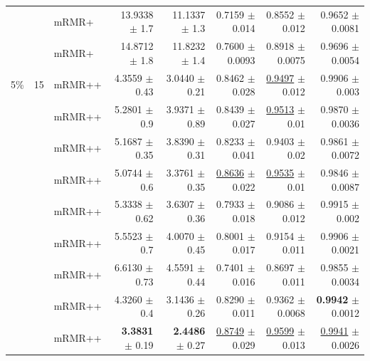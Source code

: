 \begin{longtable}{llp{}rrrrr}
 &  & mRMR+ & 13.9338 {\scriptsize $\pm$ 1.7} & 11.1337 {\scriptsize $\pm$ 1.3} & 0.7159 {\scriptsize $\pm$ 0.014} & 0.8552 {\scriptsize $\pm$ 0.012} & 0.9652 {\scriptsize $\pm$ 0.0081} \\
 &  & mRMR+ & 14.8712 {\scriptsize $\pm$ 1.8} & 11.8232 {\scriptsize $\pm$ 1.4} & 0.7600 {\scriptsize $\pm$ 0.0093} & 0.8918 {\scriptsize $\pm$ 0.0075} & 0.9696 {\scriptsize $\pm$ 0.0054} \\
\midrule
5\% & 15 & mRMR++ & 4.3559 {\scriptsize $\pm$ 0.43} & 3.0440 {\scriptsize $\pm$ 0.21} & 0.8462 {\scriptsize $\pm$ 0.028} & \underline{0.9497} {\scriptsize $\pm$ 0.012} & 0.9906 {\scriptsize $\pm$ 0.003} \\
 &  & mRMR++ & 5.2801 {\scriptsize $\pm$ 0.9} & 3.9371 {\scriptsize $\pm$ 0.89} & 0.8439 {\scriptsize $\pm$ 0.027} & \underline{0.9513} {\scriptsize $\pm$ 0.01} & 0.9870 {\scriptsize $\pm$ 0.0036} \\
 &  & mRMR++ & 5.1687 {\scriptsize $\pm$ 0.35} & 3.8390 {\scriptsize $\pm$ 0.31} & 0.8233 {\scriptsize $\pm$ 0.041} & 0.9403 {\scriptsize $\pm$ 0.02} & 0.9861 {\scriptsize $\pm$ 0.0072} \\
 &  & mRMR++ & 5.0744 {\scriptsize $\pm$ 0.6} & 3.3761 {\scriptsize $\pm$ 0.35} & \underline{0.8636} {\scriptsize $\pm$ 0.022} & \underline{0.9535} {\scriptsize $\pm$ 0.01} & 0.9846 {\scriptsize $\pm$ 0.0087} \\
 &  & mRMR++ & 5.3338 {\scriptsize $\pm$ 0.62} & 3.6307 {\scriptsize $\pm$ 0.36} & 0.7933 {\scriptsize $\pm$ 0.018} & 0.9086 {\scriptsize $\pm$ 0.012} & 0.9915 {\scriptsize $\pm$ 0.002} \\
 &  & mRMR++ & 5.5523 {\scriptsize $\pm$ 0.7} & 4.0070 {\scriptsize $\pm$ 0.45} & 0.8001 {\scriptsize $\pm$ 0.017} & 0.9154 {\scriptsize $\pm$ 0.011} & 0.9906 {\scriptsize $\pm$ 0.0021} \\
 &  & mRMR++ & 6.6130 {\scriptsize $\pm$ 0.73} & 4.5591 {\scriptsize $\pm$ 0.44} & 0.7401 {\scriptsize $\pm$ 0.016} & 0.8697 {\scriptsize $\pm$ 0.011} & 0.9855 {\scriptsize $\pm$ 0.0034} \\
 &  & mRMR++ & 4.3260 {\scriptsize $\pm$ 0.4} & 3.1436 {\scriptsize $\pm$ 0.26} & 0.8290 {\scriptsize $\pm$ 0.011} & 0.9362 {\scriptsize $\pm$ 0.0068} & \textbf{0.9942} {\scriptsize $\pm$ 0.0012} \\
 &  & mRMR++ & \textbf{3.3831} {\scriptsize $\pm$ 0.19} & \textbf{2.4486} {\scriptsize $\pm$ 0.27} & \underline{0.8749} {\scriptsize $\pm$ 0.029} & \underline{0.9599} {\scriptsize $\pm$ 0.013} & \underline{0.9941} {\scriptsize $\pm$ 0.0026} \\

\end{longtable}
